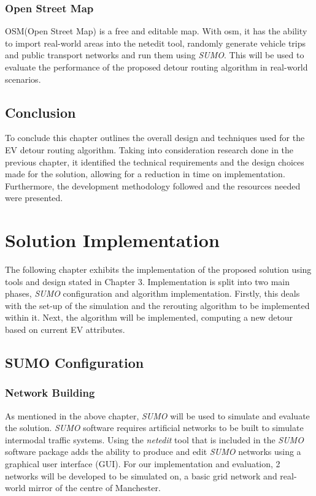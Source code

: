 \documentclass[11pt]{report}
\begin{document}
\subsection{Open Street Map}

OSM(Open Street Map) is a free and editable map. With osm, it has the ability to import real-world areas into the netedit tool, randomly generate vehicle trips and public transport networks and run them using \emph{SUMO}. This will be used to evaluate the performance of the proposed detour routing algorithm in real-world scenarios.

\section{Conclusion}

To conclude this chapter outlines the overall design and techniques used for the EV detour routing algorithm. Taking into consideration research done in the previous chapter, it identified the technical requirements and the design choices made for the solution, allowing for a reduction in time on implementation. Furthermore, the development methodology followed and the resources needed were presented.

\newpage

\chapter{Solution Implementation}

\newpage

\noindent The following chapter exhibits the implementation of the proposed solution using tools and design stated in Chapter 3. Implementation is split into two main phases, \emph{SUMO} configuration and algorithm implementation. Firstly, this deals with the set-up of the simulation and the rerouting algorithm to be implemented within it. Next, the algorithm will be implemented, computing a new detour based on current EV attributes.

\section{SUMO Configuration}

\subsection{Network Building}

As mentioned in the above chapter, \emph{SUMO} will be used to simulate and evaluate the solution. \emph{SUMO} software requires artificial networks to be built to simulate intermodal traffic systems. Using the \emph{netedit} tool that is included in the \emph{SUMO} software package adds the ability to produce and edit \emph{SUMO} networks using a graphical user interface (GUI). For our implementation and evaluation, 2 networks will be developed to be simulated on, a basic grid network and real-world mirror of the centre of Manchester.
\end{document}
